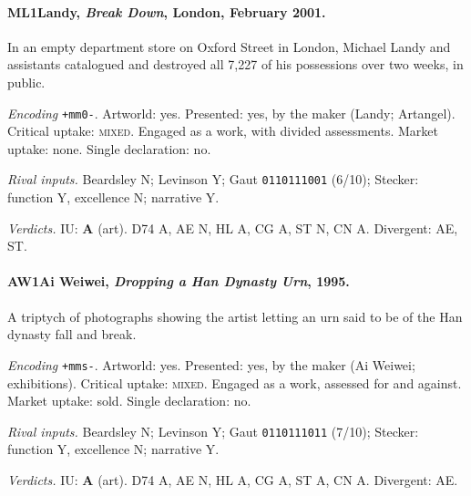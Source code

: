 \paragraph{ML1\enspace Landy, \emph{Break Down}, London, February 2001.}
In an empty department store on Oxford Street in London, Michael Landy and assistants catalogued and destroyed all 7{,}227 of his possessions over two weeks, in public.\par
\noindent\textit{Encoding} \texttt{+mm0-}. Artworld: yes. Presented: yes, by the maker (Landy; Artangel). Critical uptake: \textsc{mixed}. Engaged as a work, with divided assessments. Market uptake: none. Single declaration: no.\par
\noindent\textit{Rival inputs.} Beardsley N; Levinson Y; Gaut \texttt{0110111001} (6/10); Stecker: function Y, excellence N; narrative Y.\par
\noindent\textit{Verdicts.} IU: \textbf{A} (art). D74 A, AE N, HL A, CG A, ST N, CN A. Divergent: AE, ST.\par

\paragraph{AW1\enspace Ai Weiwei, \emph{Dropping a Han Dynasty Urn}, 1995.}
A triptych of photographs showing the artist letting an urn said to be of the Han dynasty fall and break.\par
\noindent\textit{Encoding} \texttt{+mms-}. Artworld: yes. Presented: yes, by the maker (Ai Weiwei; exhibitions). Critical uptake: \textsc{mixed}. Engaged as a work, assessed for and against. Market uptake: sold. Single declaration: no.\par
\noindent\textit{Rival inputs.} Beardsley N; Levinson Y; Gaut \texttt{0110111011} (7/10); Stecker: function Y, excellence N; narrative Y.\par
\noindent\textit{Verdicts.} IU: \textbf{A} (art). D74 A, AE N, HL A, CG A, ST A, CN A. Divergent: AE.\par

